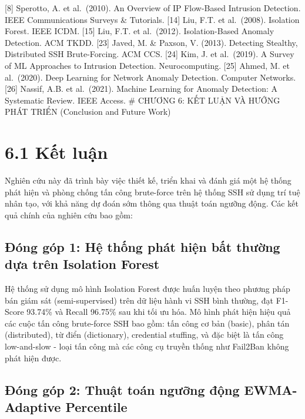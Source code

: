\documentclass[
  a4paper]{report}
\begin{document}
{[}8{]} Sperotto, A. et al.~(2010). An Overview of IP Flow-Based
Intrusion Detection. IEEE Communications Surveys \& Tutorials. {[}14{]}
Liu, F.T. et al.~(2008). Isolation Forest. IEEE ICDM. {[}15{]} Liu, F.T.
et al.~(2012). Isolation-Based Anomaly Detection. ACM TKDD. {[}23{]}
Javed, M. \& Paxson, V. (2013). Detecting Stealthy, Distributed SSH
Brute-Forcing. ACM CCS. {[}24{]} Kim, J. et al.~(2019). A Survey of ML
Approaches to Intrusion Detection. Neurocomputing. {[}25{]} Ahmed, M. et
al.~(2020). Deep Learning for Network Anomaly Detection. Computer
Networks. {[}26{]} Nassif, A.B. et al.~(2021). Machine Learning for
Anomaly Detection: A Systematic Review. IEEE Access. \# CHƯƠNG 6: KẾT
LUẬN VÀ HƯỚNG PHÁT TRIỂN (Conclusion and Future Work)

\section{6.1 Kết luận}\label{kux1ebft-luux1eadn}

Nghiên cứu này đã trình bày việc thiết kế, triển khai và đánh giá một hệ
thống phát hiện và phòng chống tấn công brute-force trên hệ thống SSH sử
dụng trí tuệ nhân tạo, với khả năng dự đoán sớm thông qua thuật toán
ngưỡng động. Các kết quả chính của nghiên cứu bao gồm:

\subsection{Đóng góp 1: Hệ thống phát hiện bất thường dựa trên Isolation
Forest}\label{ux111uxf3ng-guxf3p-1-hux1ec7-thux1ed1ng-phuxe1t-hiux1ec7n-bux1ea5t-thux1b0ux1eddng-dux1ef1a-truxean-isolation-forest}

Hệ thống sử dụng mô hình Isolation Forest được huấn luyện theo phương
pháp bán giám sát (semi-supervised) trên dữ liệu hành vi SSH bình
thường, đạt F1-Score 93.74\% và Recall 96.75\% sau khi tối ưu hóa. Mô
hình phát hiện hiệu quả các cuộc tấn công brute-force SSH bao gồm: tấn
công cơ bản (basic), phân tán (distributed), từ điển (dictionary),
credential stuffing, và đặc biệt là tấn công low-and-slow - loại tấn
công mà các công cụ truyền thống như Fail2Ban không phát hiện được.

\subsection{Đóng góp 2: Thuật toán ngưỡng động EWMA-Adaptive
Percentile}\label{ux111uxf3ng-guxf3p-2-thuux1eadt-touxe1n-ngux1b0ux1ee1ng-ux111ux1ed9ng-ewma-adaptive-percentile}
\end{document}
